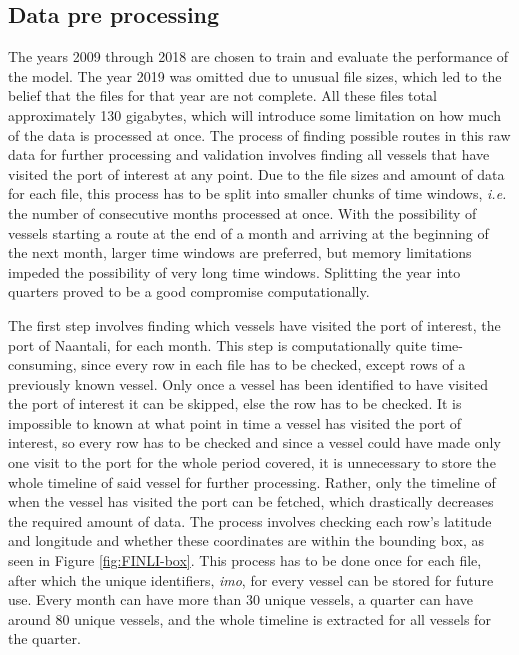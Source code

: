 \documentclass[../main.tex]{subfiles}
\begin{document}
\subsection{Data pre processing}

The years 2009 through 2018 are chosen to train and evaluate the performance of the model. The year 2019 was omitted due to unusual file sizes, which led to the belief that the files for that year are not complete. All these files total approximately 130 gigabytes, which will introduce some limitation on how much of the data is processed at once. The process of finding possible routes in this raw data for further processing and validation involves finding all vessels that have visited the port of interest at any point. Due to the file sizes and amount of data for each file, this process has to be split into smaller chunks of time windows, \textit{i.e.} the number of consecutive months processed at once. With the possibility of vessels starting a route at the end of a month and arriving at the beginning of the next month, larger time windows are preferred, but memory limitations impeded the possibility of very long time windows. Splitting the year into quarters proved to be a good compromise computationally.

The first step involves finding which vessels have visited the port of interest, the port of Naantali, for each month. This step is computationally quite time-consuming, since every row in each file has to be checked, except rows of a previously known vessel. Only once a vessel has been identified to have visited the port of interest it can be skipped, else the row has to be checked. It is impossible to known at what point in time a vessel has visited the port of interest, so every row has to be checked and since a vessel could have made only one visit to the port for the whole period covered, it is unnecessary to store the whole timeline of said vessel for further processing. Rather, only the timeline of when the vessel has visited the port can be fetched, which drastically decreases the required amount of data. The process involves checking each row's latitude and longitude and whether these coordinates are within the bounding box, as seen in Figure \ref{fig:FINLI-box}. This process has to be done once for each file, after which the unique identifiers, \textit{imo}, for every vessel can be stored for future use. Every month can have more than 30 unique vessels, a quarter can have around 80 unique vessels, and the whole timeline is extracted for all vessels for the quarter.
\end{document}
